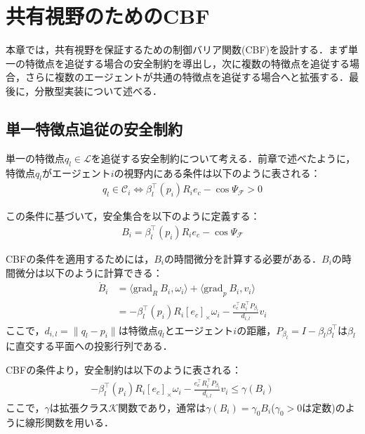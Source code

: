 \section{共有視野のためのCBF}

本章では，共有視野を保証するための制御バリア関数(CBF)を設計する．まず単一の特徴点を追従する場合の安全制約を導出し，次に複数の特徴点を追従する場合，さらに複数のエージェントが共通の特徴点を追従する場合へと拡張する．最後に，分散型実装について述べる．

\subsection{単一特徴点追従の安全制約}

単一の特徴点$q_l \in \mathcal{L}$を追従する安全制約について考える．前章で述べたように，特徴点$q_l$がエージェント$i$の視野内にある条件は以下のように表される：
\begin{equation}
\begin{aligned}
q_l \in \mathcal{C}_i \iff \beta_l^{\top}(p_i)R_ie_c - \cos\Psi_{\mathcal{F}} > 0
\label{eq:single_fov_condition}
\end{aligned}
\end{equation}

この条件に基づいて，安全集合を以下のように定義する：
\begin{equation}
\begin{aligned}
B_i = \beta_l^{\top}(p_i)R_ie_c - \cos\Psi_{\mathcal{F}}
\label{eq:single_safe_set}
\end{aligned}
\end{equation}

CBFの条件を適用するためには，$B_i$の時間微分を計算する必要がある．$B_i$の時間微分は以下のように計算できる：
\begin{equation}
\begin{aligned}
\dot{B}_i &= \langle \mathrm{grad}_R\:B_i, \omega_i \rangle + \langle \mathrm{grad}_p\:B_i, v_i \rangle \\
&= -\beta_l^\top(p_i) R_i [e_c]_\times\omega_i - \frac{e_c^\top R_i^\top P_{\beta_l}}{d_{i,l}}v_i
\label{eq:single_cbf_derivative}
\end{aligned}
\end{equation}
ここで，$d_{i,l} = \|q_l-p_i\|$は特徴点$q_l$とエージェント$i$の距離，$P_{\beta_l} = I - \beta_l\beta_l^\top$は$\beta_l$に直交する平面への投影行列である．

CBFの条件より，安全制約は以下のように表される：
\begin{equation}
\begin{aligned}
-\beta_l^\top(p_i) R_i [e_c]_\times\omega_i - \frac{e_c^\top R_i^\top P_{\beta_l}}{d_{i,l}}v_i \leq \gamma (B_i)
\label{eq:single_cbf_constraint}
\end{aligned}
\end{equation}
ここで，$\gamma$は拡張クラス$\mathcal{K}$関数であり，通常は$\gamma(B_i) = \gamma_0 B_i$($\gamma_0 > 0$は定数)のように線形関数を用いる．

